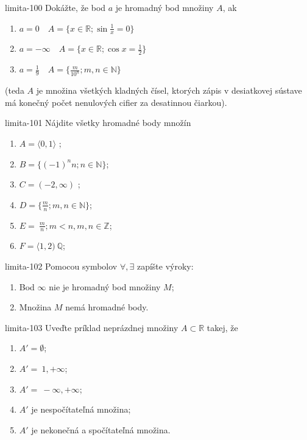 \begin{defproblem}{limita-100}
Dokážte, že bod $a$ je hromadný bod množiny $A$, ak
\begin{enumerate}
    \item $a=0 \quad A=\{x \in \mathbb{R}; \sin{\frac{1}{x}} = 0 \}$
    \item $a=-\infty \quad A=\{x \in \mathbb{R}; \cos{x} = \frac{1}{2} \}$
    \item $a=\frac{1}{9} \quad A=\{\frac{m}{10^n}; m,n \in \mathbb{N} \}$
\end{enumerate}
(teda $A$ je množina všetkých kladných čísel, ktorých zápis v desiatkovej
sústave má konečný počet nenulových cifier za desatinnou čiarkou).
\end{defproblem}

\begin{defproblem}{limita-101}
Nájdite všetky hromadné body množín
\begin{multicols}{2}
\begin{enumerate}
\item $A= \langle 0,1 \rangle$ ;
\item $B= \{ (-1)^n n; n\in \mathbb{N} \} $;
\item $C= (-2,\infty)$ ;
\item $D= \{\frac{m}{n}; m,n \in \mathbb{N} \}$;
\item $E= {\ \frac{m}{n}; m<n,m,n \in \mathbb{Z}}$;
\item $F= \langle 1,2 ) \ \mathbb{Q}$;
\end{enumerate}
\end{multicols}
\end{defproblem}

\begin{defproblem}{limita-102}
Pomocou symbolov $\forall,\exists$ zapíšte výroky:
\begin{enumerate}
\item Bod $\infty$ nie je hromadný bod množiny $M$;
\item Množina $M$ nemá hromadné body.
\end{enumerate}
\end{defproblem}

\begin{defproblem}{limita-103}
Uveďte príklad neprázdnej množiny $A \subset \mathbb{R}$ takej, že
\begin{enumerate}
\item $A'=\emptyset$;
\item $A'={\ 1, +\infty}$;
\item $A'={\ -\infty,+\infty}$;
\item $A'$ je nespočítateľná množina;
\item $A'$ je nekonečná a spočítateľná množina.
\end{enumerate}
\end{defproblem}

